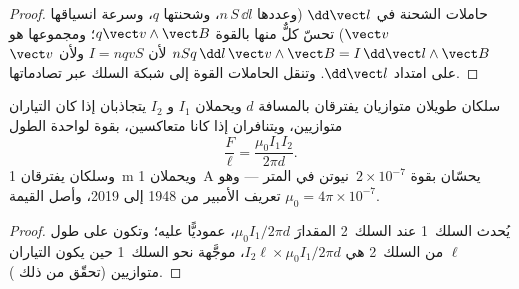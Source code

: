 \begin{proof}
حاملات الشحنة في $\dd\vect l$ (وعددها $n\,S\,\dd l$، وشحنتها $q$،
وسرعة انسياقها $\vect v$) تحسّ كلٌّ منها بالقوة $q\vect v\wedge\vect B$؛ ومجموعها هو
$nSq\,\dd l\,\vect v\wedge\vect B = I\,\dd\vect l\wedge\vect B$ لأن $I = nqvS$
ولأن $\vect v$ على امتداد $\dd\vect l$. وتنقل الحاملات القوة إلى
شبكة السلك عبر تصادماتها.
\end{proof}

\begin{proposition}\label{prop:b1:magnetostatics:parallel}
سلكان طويلان متوازيان يفترقان بالمسافة $d$ ويحملان $I_1$ و $I_2$
يتجاذبان إذا كان التياران متوازيين، ويتنافران إذا كانا متعاكسين،
بقوة لواحدة الطول
\[
\frac{F}{\ell} = \frac{\mu_0I_1I_2}{2\pi d} .
\]
وسلكان يفترقان \qty{1}{m} ويحملان \qty{1}{A} يحسّان بقوة $2 \times 10^{-7}$~نيوتن في
المتر --- وهو تعريف الأمبير من 1948 إلى 2019، وأصل
القيمة $\mu_0 = 4\pi \times 10^{-7}$.
\end{proposition}

\begin{proof}
يُحدث السلك~1 عند السلك~2 المقدارَ $\mu_0I_1/2\pi d$، عموديًّا عليه؛ وتكون
 على طول $\ell$ من السلك~2 هي $I_2\ell \times \mu_0I_1/2\pi d$،
موجَّهة نحو السلك~1 حين يكون التياران متوازيين (تحقّق من ذلك
).
\end{proof}

